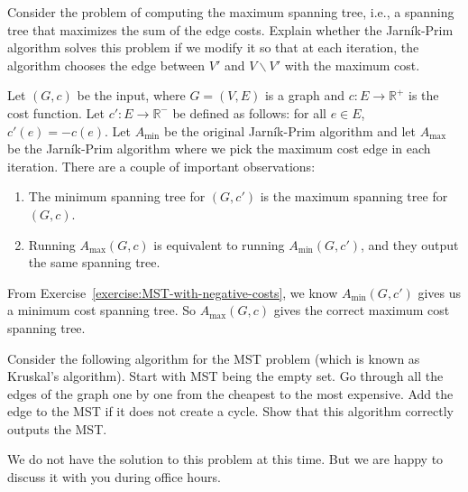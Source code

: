 \begin{flex}
\label{grp:exercise:Maximum-spanning-tree}

\begin{exercise}
\label{exercise:Maximum-spanning-tree}
Consider the problem of computing the maximum spanning tree, i.e., a spanning tree that maximizes the sum of the edge costs. Explain whether the Jarn\'{i}k-Prim algorithm solves this problem if we modify it so that at each iteration, the algorithm chooses the edge between $V'$ and $V\backslash V'$ with the maximum cost.

\end{exercise}

\begin{solution}
\label{sol:intro-to-graph-theory::input}
Let $(G,c)$ be the input, where $G = (V,E)$ is a graph and $c: E \to \mathbb{R}^+$ is the cost function. Let $c' : E \to \mathbb{R}^{-}$ be defined as follows: for all $e \in E$, $c'(e) = - c(e)$. Let $A_{\min}$ be the original Jarn\'{i}k-Prim algorithm and let $A_{\max}$ be the Jarn\'{i}k-Prim algorithm where we pick the maximum cost edge in each iteration.  There are a couple of important observations:
\begin{enumerate}
    \item The minimum spanning tree for $(G,c')$ is the maximum spanning tree for $(G,c)$. 
    \item Running $A_{\max}(G,c)$ is equivalent to running $A_{\min}(G,c')$, and they output the same spanning tree. 
\end{enumerate}
From Exercise~\ref{exercise:MST-with-negative-costs}, we know $A_{\min}(G,c')$ gives us a minimum cost spanning tree. So $A_{\max}(G,c)$ gives the correct maximum cost spanning tree.

\end{solution}
\end{flex}

\begin{flex}
\label{grp:exercise:Kruskals-algorithm}

\begin{exercise}
\label{exercise:Kruskals-algorithm}
Consider the following algorithm for the MST problem (which is known as Kruskal's algorithm). Start with MST being the empty set. Go through all the edges of the graph one by one from the cheapest to the most expensive. Add the edge to the MST if it does not create a cycle. Show that this algorithm correctly outputs the MST.

\end{exercise}

\begin{solution}
\label{sol:intro-to-graph-theory::time}
We do not have the solution to this problem at this time. But we are happy to discuss it with you during office hours.

\end{solution}
\end{flex}


